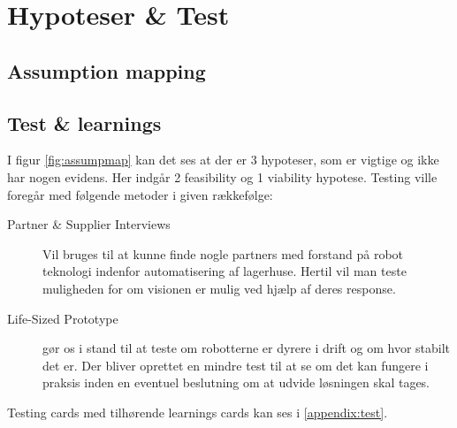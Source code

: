 \section{Hypoteser \& Test}

\subsection{Assumption mapping}

\subsection{Test \& learnings}
I figur \ref{fig:assumpmap} kan det ses at der er 3 hypoteser, som er vigtige og ikke har nogen evidens. Her indgår 2 feasibility og 1 viability hypotese. Testing ville foregår med følgende metoder i given rækkefølge:
\begin{description}
    \item [Partner \& Supplier Interviews] Vil bruges til at kunne finde nogle partners med forstand på robot teknologi indenfor automatisering af lagerhuse. Hertil vil man teste muligheden for om visionen er mulig ved hjælp af deres response.

    \item [Life-Sized Prototype] gør os i stand til at teste om robotterne er dyrere i drift og om hvor stabilt det er. Der bliver oprettet en mindre test til at se om det kan fungere i praksis inden en eventuel beslutning om at udvide løsningen skal tages.
    
\end{description}

Testing cards med tilhørende learnings cards kan ses i \autoref{appendix:test}.

